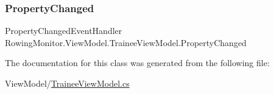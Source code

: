 \subsubsection{\texorpdfstring{Property\+Changed}{PropertyChanged}}
{\footnotesize\ttfamily Property\+Changed\+Event\+Handler Rowing\+Monitor.\+View\+Model.\+Trainee\+View\+Model.\+Property\+Changed}



The documentation for this class was generated from the following file\+:\begin{DoxyCompactItemize}
\item 
View\+Model/\hyperlink{_trainee_view_model_8cs}{Trainee\+View\+Model.\+cs}\end{DoxyCompactItemize}
